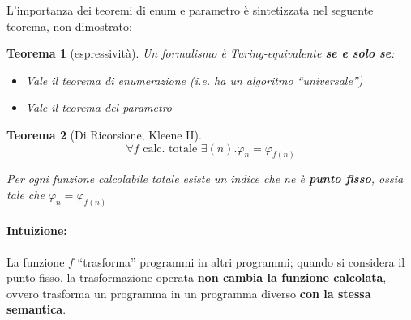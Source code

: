 \documentclass[a4paper,10pt,oneside]{article}
\theoremstyle{break}
\newtheorem{teo}{Teorema}[subsection]
\begin{document}
L'importanza dei teoremi di enum e parametro è sintetizzata nel seguente teorema, non dimostrato:
\begin{mdframed}
\begin{teo}[espressività]
Un formalismo è Turing-equivalente \textbf{\emph{se e solo se}}:
\begin{itemize}
 \item Vale il teorema di enumerazione (i.e. ha un algoritmo ``universale'')
 \item Vale il teorema del parametro
\end{itemize}

\end{teo}

\end{mdframed}

\newpage
\begin{mdframed}
\begin{teo}[Di Ricorsione, Kleene II]
\[ \forall f \text{ calc. totale } \exists(n) . \varphi_n = \varphi_{f(n)} \]

Per ogni funzione calcolabile totale esiste un indice che ne è \textbf{punto fisso}, ossia tale che $\varphi_n = \varphi_{f(n)}$
\end{teo}

\dotfill

\paragraph{Intuizione:} La funzione $f$ ``trasforma'' programmi in altri programmi; quando si considera il punto fisso, la trasformazione operata \textbf{non cambia la funzione calcolata}, ovvero trasforma un programma in un programma diverso \textbf{con la stessa semantica}.\smallskip

\dotfill


\end{mdframed}
\end{document}

